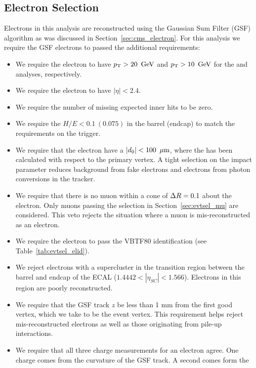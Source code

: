 \subsection{Electron Selection}
\label{sec:evtsel_el}
Electrons in this analysis are reconstructed using the Gaussian Sum Filter
(GSF) algorithm as was discussed in Section~\ref{sec:cms_electron}. For this analysis we
require the GSF electrons to passed the additional requirements:
\begin{itemize}
\item We require the electron to have $p_{\mathrm{T}} > 20\ \,\text{Ge\hspace{-.08em}V}$ and $\pt > 10\ \GeV$ for
the \hpt and \lpt analyses, respectively.
\item We require the electron to have $|\eta| < 2.4$.
\item We require the number of missing expected inner hits to be zero.
\item We require the $H/E < 0.1\ (0.075)$ in the barrel (endcap) to match the
requirements on the trigger.
\item We require that the electron have a $|d_{\mathrm{0}}| < 100\ \,\mu\text{m}$, where the
\dzero has been calculated with respect to the primary vertex. A tight
selection on the impact parameter reduces background from fake electrons and
electrons from photon conversions in the tracker.
\item We require that there is no muon within a cone of $\Delta R = 0.1$ about the
electron. Only muons passing the selection in Section~\ref{sec:evtsel_mu} are
considered. This veto rejects the situation where a muon is mis-reconstructed
as an electron.
\item We require the electron to pass the VBTF80 identification (see
Table~\ref{tab:evtsel_elid}).
\item We reject electrons with a supercluster \aeta in the transition region
between the barrel and endcap of the ECAL ($1.4442 < |\eta_{SC}| < 1.566$).
Electrons in this region are poorly reconstructed.
\item We require that the GSF track $z$ be less than 1 mm from the first
good vertex, which we take to be the event vertex. This requirement helps
reject mis-reconstructed electrons as well as those originating from pile-up
interactions.
\item We require that all three charge measurements for an electron agree.
One charge comes from the curvature of the GSF track. A second comes form the

\end{itemize}

